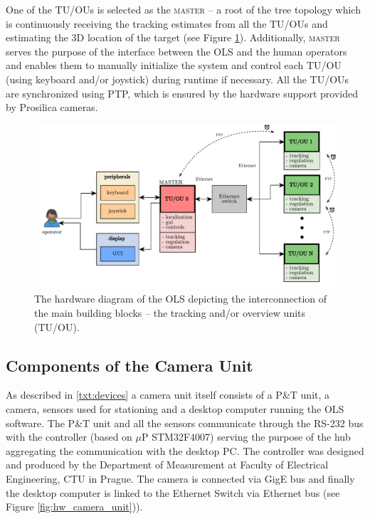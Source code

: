 One of the TU/OUs is selected as the \textsc{master} -- a root of the tree topology which is continuously receiving the tracking estimates from all the TU/OUs and estimating the 3D location of the target (see Figure \ref{fig:hw_ols}). Additionally, \textsc{master} serves the purpose of the interface between the OLS and the human operators and enables them to manually initialize the system and control each TU/OU (using keyboard and/or joystick) during runtime if necessary. All the TU/OUs are synchronized using PTP, which is ensured by the hardware support provided by Prosilica cameras.


\begin{figure}[htb]
	\centering
	\includegraphics[width=0.9\linewidth]{fig/hwsw_architecture.pdf}
	\caption{The hardware diagram of the OLS depicting the interconnection of the main building blocks -- the tracking and/or overview units (TU/OU).}
	\label{fig:hw_ols}
\end{figure}

\subsection{Components of the Camera Unit} \label{txt:components_of_cu}

As described in \ref{txt:devices} a camera unit itself consists of a P\&T unit, a camera, sensors used for stationing and a desktop computer running the OLS software. The P\&T unit and all the sensors communicate through the RS-232 bus with the controller (based on $\mu$P STM32F4007) serving the purpose of the hub aggregating the communication with the desktop PC. The controller was designed and produced by the Department of Measurement at Faculty of Electrical Engineering, CTU in Prague. The camera is connected via GigE bus and finally the desktop computer is linked to the Ethernet Switch via Ethernet bus (see Figure \ref{fig:hw_camera_unit})).

